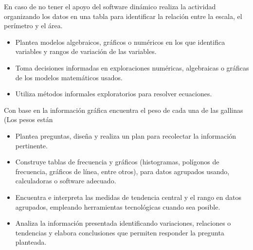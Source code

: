 
En caso de no tener el apoyo del software dinámico realiza la actividad organizando los datos en una tabla para identificar la relación entre la escala, el perímetro y el área.



\evidencias

\begin{itemize}
  \item Plantea modelos algebraicos, gráficos o numéricos en los que identifica variables y rangos de variación de las variables.
  \item Toma decisiones informadas en exploraciones numéricas, algebraicas o gráficas de los modelos matemáticos usados.
  \item Utiliza métodos informales exploratorios para resolver ecuaciones.
\end{itemize}

\ejemplo

Con base en la información gráfica encuentra el peso de cada una de las gallinas (Los pesos están




\evidencias

\begin{itemize}
  \item Plantea preguntas, diseña y realiza un plan para recolectar la información pertinente.
  \item Construye tablas de frecuencia y gráficos (histogramas, polígonos de frecuencia, gráficos de línea, entre otros), para datos agrupados usando, calculadoras o software adecuado.
  \item Encuentra e interpreta las medidas de tendencia central y el rango en datos agrupados, empleando herramientas tecnológicas cuando sea posible.
  \item Analiza la información presentada identificando variaciones, relaciones o tendencias y elabora conclusiones que permiten responder la pregunta planteada.
\end{itemize}


